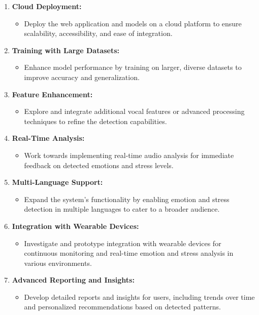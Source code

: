 \begin{enumerate}
    \item \textbf{Cloud Deployment:}
    \begin{itemize}
        \item Deploy the web application and models on a cloud platform to ensure scalability, accessibility, and ease of integration.
    \end{itemize}
    \item \textbf{Training with Large Datasets:}
    \begin{itemize}
        \item Enhance model performance by training on larger, diverse datasets to improve accuracy and generalization.
    \end{itemize}
    \item \textbf{Feature Enhancement:}
    \begin{itemize}
        \item Explore and integrate additional vocal features or advanced processing techniques to refine the detection capabilities.
    \end{itemize}
    \item \textbf{Real-Time Analysis:}
    \begin{itemize}
        \item Work towards implementing real-time audio analysis for immediate feedback on detected emotions and stress levels.
    \end{itemize}
    \item \textbf{Multi-Language Support:}
    \begin{itemize}
        \item Expand the system's functionality by enabling emotion and stress detection in multiple languages to cater to a broader audience.
    \end{itemize}
    \item \textbf{Integration with Wearable Devices:}
    \begin{itemize}
        \item Investigate and prototype integration with wearable devices for continuous monitoring and real-time emotion and stress analysis in various environments.
    \end{itemize}
    \item \textbf{Advanced Reporting and Insights:}
    \begin{itemize}
        \item Develop detailed reports and insights for users, including trends over time and personalized recommendations based on detected patterns.
    \end{itemize}
\end{enumerate}
